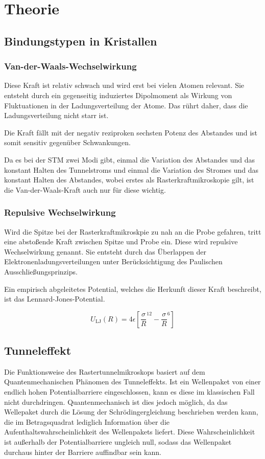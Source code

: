 \section{Theorie}
\subsection{Bindungstypen in Kristallen}
\subsubsection{Van-der-Waals-Wechselwirkung}
Diese Kraft ist relativ schwach und wird erst bei vielen Atomen relevant. Sie entsteht durch ein gegenseitig induziertes Dipolmoment als Wirkung von Fluktuationen in der Ladungsverteilung der Atome. Das rührt daher, dass die Ladungsverteilung nicht starr ist.

\noindent Die Kraft fällt mit der negativ reziproken sechsten Potenz des Abstandes und ist somit sensitiv gegenüber Schwankungen.

\noindent Da es bei der STM zwei Modi gibt, einmal die Variation des Abstandes und das konstant Halten des Tunnelstroms und einmal die Variation des Stromes und das konstant Halten des Abstandes, wobei erstes als Rasterkraftmikroskopie gilt, ist die Van-der-Waals-Kraft auch nur für diese wichtig.

\subsubsection{Repulsive Wechselwirkung}
Wird die Spitze bei der Rasterkraftmikroskpie zu nah an die Probe gefahren, tritt eine abstoßende Kraft zwischen Spitze und Probe ein. Diese wird repulsive Wechselwirkung genannt. Sie entsteht durch das Überlappen der Elektronenladungsverteilungen unter Berücksichtigung des Paulischen Ausschließungsprinzips.

\noindent Ein empirisch abgeleitetes Potential, welches die Herkunft dieser Kraft beschreibt, ist das Lennard-Jones-Potential.

\begin{equation}
U_\text{LJ}(R)=4\epsilon\left[\frac{\sigma}{R}^12-\frac{\sigma}{R}^6\right]
\end{equation}

\subsection{Tunneleffekt}
Die Funktionsweise des Rastertunnelmikroskops basiert auf dem Quantenmechanischen Phänomen des Tunneleffekts. Ist ein Wellenpaket von einer endlich hohen Potentialbarriere eingeschlossen, kann es diese im klassischen Fall nicht durchdringen. Quantenmechanisch ist dies jedoch möglich, da das Wellepaket durch die Lösung der Schrödingergleichung beschrieben werden kann, die im Betragsquadrat lediglich Information über die Aufenthaltswahrscheinlichkeit des Wellenpakets liefert. Diese Wahrscheinlichkeit ist außerhalb der Potentialbarriere ungleich null, sodass das Wellenpaket durchaus hinter der Barriere auffindbar sein kann. 

